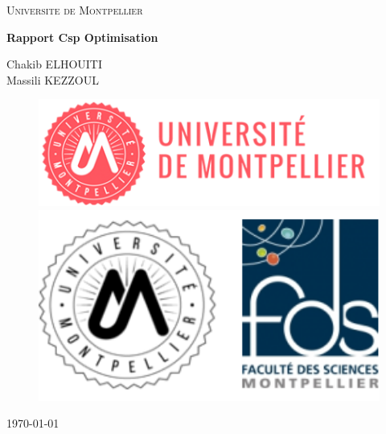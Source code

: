 \documentclass[oneside,13pt,a4paper]{article}
\title{}
\author{
    Chakib ELHOUITI \and
    Massili KEZZOUL \and
}
\date{\today}
\begin{document}
\begin{titlepage}
	\centering
	{\scshape\LARGE Universite de Montpellier\par}
	{\scshape\Large\par}
	\vspace{1.5cm}
	{\huge\bfseries Rapport Csp Optimisation\par}
	\vspace{2cm}
	{\Large\itshape
		
		Chakib ELHOUITI \\
		Massili KEZZOUL \\
		
		\par}

		\vspace{2cm}

	\begin{figure}[h]
		\begin{minipage}[c]{.46\linewidth}
			\centering
			\includegraphics[width=1\textwidth]{img/univ-montpellier.png}
		\end{minipage}
		\hfill%
		\begin{minipage}[c]{.46\linewidth}
			\centering
			\includegraphics[width=1\textwidth]{img/fds.png}
		\end{minipage}
	\end{figure}

	\par\vspace{1cm}

	\vfill

	{\large \today\par}
\end{titlepage}
\end{document}
